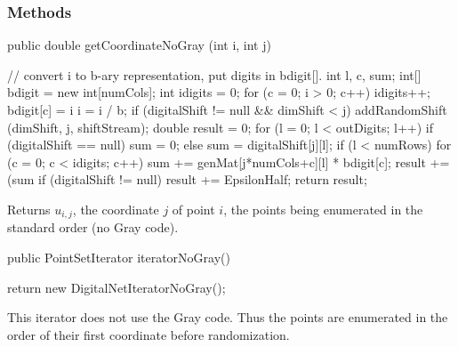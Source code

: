 \subsubsection* {Methods}
\begin{code}

   public double getCoordinateNoGray (int i, int j)\begin{hide} {
      // convert i to b-ary representation, put digits in bdigit[].
      int l, c, sum;
      int[] bdigit = new int[numCols];
      int idigits = 0;
      for (c = 0; i > 0; c++) {
         idigits++;
         bdigit[c] = i %
         i = i / b;
      }
      if (digitalShift != null && dimShift < j)
         addRandomShift (dimShift, j, shiftStream);
      double result = 0;
      for (l = 0; l < outDigits; l++) {
         if (digitalShift == null)
            sum = 0;
         else
            sum = digitalShift[j][l];
         if (l < numRows)
            for (c = 0; c < idigits; c++)
               sum += genMat[j*numCols+c][l] * bdigit[c];
         result += (sum %
      }
      if (digitalShift != null)
         result += EpsilonHalf;
      return result;
   }\end{hide}
\end{code}
 \begin{tabb}
   Returns $u_{i,j}$, the coordinate $j$ of point $i$, the points
   being enumerated in the standard order (no Gray code).
 \end{tabb}
\begin{htmlonly}
\end{htmlonly}
\begin{code}

   public PointSetIterator iteratorNoGray()\begin{hide} {
      return new DigitalNetIteratorNoGray();
   }\end{hide}
\end{code}
\begin{tabb}
  This iterator does not use the Gray code. Thus the points are enumerated
  in the order of their first coordinate before randomization.
\end{tabb}
